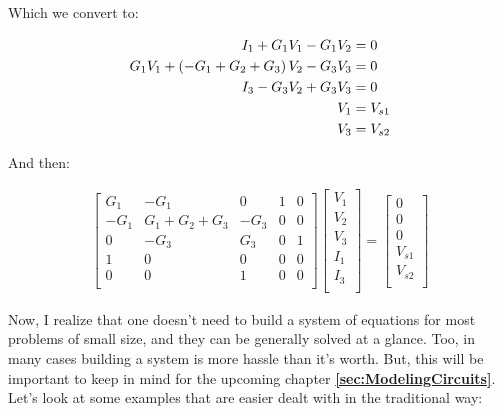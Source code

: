 Which we convert to: 

\begin{equation} \label{lattice6}
\begin{split}
I_1 + G_1V_1 - G_1V_2 &= 0 \\
G_1V_1 + \left(-G_1 + G_2 + G_3\right)V_2 - G_3V_3 &= 0 \\ 
I_3 - G_3V_2 + G_3V_3 &= 0 \\
V_1 & = V_{s1} \\
V_3 & = V_{s2} \\
\end{split}
\end{equation}

And then: 

\begin{align}
\begin{bmatrix} 
G_1 &   -G_1 &  0   & 1     &   0    \\
-G_1 &   G_1 + G_2 + G_3 &  -G_3   & 0     &   0    \\
0 &   -G_3 &  G_3   & 0     &   1    \\
1 &   0 &  0   & 0     &   0    \\
0 &   0 &  1   & 0     &   0    \\
\end{bmatrix}
\begin{bmatrix} 
V_1      \\
V_2      \\
V_3      \\
I_1      \\
I_3      \\
\end{bmatrix}
= 
\begin{bmatrix} 
0     \\
0      \\
0     \\
V_{s1}      \\
V_{s2}     \\
\end{bmatrix}
\end{align}


Now, I realize that one doesn't need to build a system of equations for most problems of small size, and they can be generally solved at a glance. Too, in many cases building a system is more hassle than it's worth. But, this will be important to keep in mind for the upcoming chapter \textbf{\ref{sec:ModelingCircuits}}. Let's look at some examples that are easier dealt with in the traditional way:



